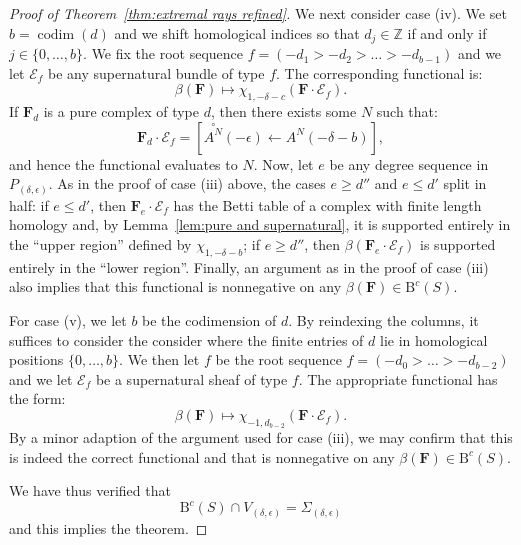 \documentclass[12pt]{amsart}
\theoremstyle{definition}
\theoremstyle{remark}
\newcommand{\codim}{\operatorname{codim}}
\newcommand{\ZZ}{\mathbb{Z}}
\newcommand{\cc}{c}
\newcommand{\dd}{d}
\newcommand{\cE}{\mathcal{E}}
\newcommand{\FF}{\mathbf{F}}
\newcommand{\zp}{\circ}
\newcommand{\BBQ}{\mathrm{B}}
\begin{document}
\begin{proof}[Proof of Theorem~\ref{thm:extremal rays refined}]
We next consider case (iv).  We set $b=\codim(d)$ and we shift homological indices so that $d_j\in \ZZ$ if and only if $j\in \{0, \dots, b\}$.
We fix the root sequence $f=(-d_{1}>-d_{2}>\dots>-d_{b-1})$ and we let $\cE_f$ be any supernatural bundle of type $f$.   The corresponding functional is:
\[
\beta(\FF)\mapsto \chi_{1,-\delta-c}(\FF\cdot \cE_f).
\]
If $\FF_d$ is a pure complex of type $\dd$, then there exists some $N$ such that:
\[
\FF_d\cdot \cE_f=\left[ \overset{\zp}{A^N}(-\epsilon)\gets A^N(-\delta-b) \right],
\]
and hence the functional evaluates to $N$.  
Now, let $e$ be any degree sequence in $P_{(\delta,\epsilon)}$.  As in the proof of case (iii) above, the cases $e\geq d''$ and $e\leq d'$ split in half:
if $e\leq d'$, then $\FF_e\cdot \cE_f$ has the Betti table of a complex with finite length homology and, by Lemma~\ref{lem:pure and supernatural}, it is supported entirely in the ``upper region'' defined by $\chi_{1,-\delta-b}$; if $e\geq d''$, then $\beta(\FF_e\cdot \cE_f)$ is supported entirely in the ``lower region''.  Finally, an argument as in the proof of case (iii) also implies that this functional is nonnegative on any $\beta(\FF)\in \BBQ^{\cc}(S)$.

For case (v), we let $b$ be the codimension of $\dd$.  By reindexing the columns, it suffices to consider the consider where the finite entries of $\dd$ lie in homological positions $\{0,\dots,b\}$.  We then let $f$ be the root sequence $f=(-d_0>\dots >-d_{b-2})$ and we let $\cE_f$ be a supernatural sheaf of type $f$.  The appropriate functional has the form:
\[
\beta(\FF)\mapsto \chi_{-1,d_{b-2}}(\FF\cdot \cE_f).
\]
By a minor adaption of the argument used for case (iii), we may confirm that this is indeed the correct functional and that is nonnegative on any $\beta(\FF)\in \BBQ^{\cc}(S)$.
%
%

We have thus verified that
\[
\BBQ^{\cc}(S)\cap V_{(\delta,\epsilon)}=\Sigma_{(\delta,\epsilon)}
\]
and this implies the theorem.
\end{proof}
\end{document}
